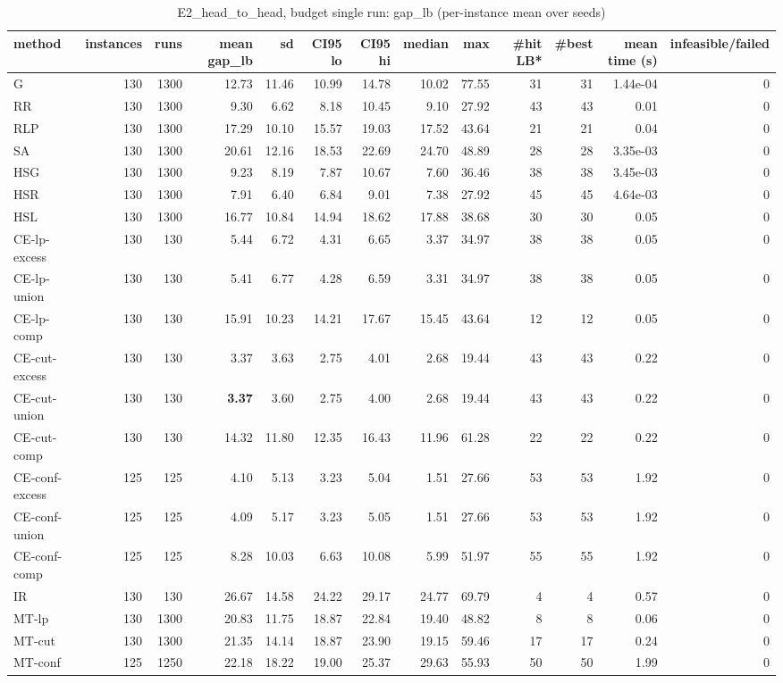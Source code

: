 \begin{table}[htbp]
\centering
\small
\caption{E2\_head\_to\_head, budget single run: gap\_lb (per-instance mean over seeds)}
\label{tab:E2_head_to_head_summary}
\begin{tabular}{lrrrrrrrrrrrr}
\toprule
method & instances & runs & mean gap\_lb & sd & CI95 lo & CI95 hi & median & max & \#hit LB* & \#best & mean time (s) & infeasible/failed \\
\midrule
G & 130 & 1300 & 12.73 & 11.46 & 10.99 & 14.78 & 10.02 & 77.55 & 31 & 31 & 1.44e-04 & 0 \\
RR & 130 & 1300 & 9.30 & 6.62 & 8.18 & 10.45 & 9.10 & 27.92 & 43 & 43 & 0.01 & 0 \\
RLP & 130 & 1300 & 17.29 & 10.10 & 15.57 & 19.03 & 17.52 & 43.64 & 21 & 21 & 0.04 & 0 \\
SA & 130 & 1300 & 20.61 & 12.16 & 18.53 & 22.69 & 24.70 & 48.89 & 28 & 28 & 3.35e-03 & 0 \\
HSG & 130 & 1300 & 9.23 & 8.19 & 7.87 & 10.67 & 7.60 & 36.46 & 38 & 38 & 3.45e-03 & 0 \\
HSR & 130 & 1300 & 7.91 & 6.40 & 6.84 & 9.01 & 7.38 & 27.92 & 45 & 45 & 4.64e-03 & 0 \\
HSL & 130 & 1300 & 16.77 & 10.84 & 14.94 & 18.62 & 17.88 & 38.68 & 30 & 30 & 0.05 & 0 \\
CE-lp-excess & 130 & 130 & 5.44 & 6.72 & 4.31 & 6.65 & 3.37 & 34.97 & 38 & 38 & 0.05 & 0 \\
CE-lp-union & 130 & 130 & 5.41 & 6.77 & 4.28 & 6.59 & 3.31 & 34.97 & 38 & 38 & 0.05 & 0 \\
CE-lp-comp & 130 & 130 & 15.91 & 10.23 & 14.21 & 17.67 & 15.45 & 43.64 & 12 & 12 & 0.05 & 0 \\
CE-cut-excess & 130 & 130 & 3.37 & 3.63 & 2.75 & 4.01 & 2.68 & 19.44 & 43 & 43 & 0.22 & 0 \\
CE-cut-union & 130 & 130 & \textbf{3.37} & 3.60 & 2.75 & 4.00 & 2.68 & 19.44 & 43 & 43 & 0.22 & 0 \\
CE-cut-comp & 130 & 130 & 14.32 & 11.80 & 12.35 & 16.43 & 11.96 & 61.28 & 22 & 22 & 0.22 & 0 \\
CE-conf-excess & 125 & 125 & 4.10 & 5.13 & 3.23 & 5.04 & 1.51 & 27.66 & 53 & 53 & 1.92 & 0 \\
CE-conf-union & 125 & 125 & 4.09 & 5.17 & 3.23 & 5.05 & 1.51 & 27.66 & 53 & 53 & 1.92 & 0 \\
CE-conf-comp & 125 & 125 & 8.28 & 10.03 & 6.63 & 10.08 & 5.99 & 51.97 & 55 & 55 & 1.92 & 0 \\
IR & 130 & 130 & 26.67 & 14.58 & 24.22 & 29.17 & 24.77 & 69.79 & 4 & 4 & 0.57 & 0 \\
MT-lp & 130 & 1300 & 20.83 & 11.75 & 18.87 & 22.84 & 19.40 & 48.82 & 8 & 8 & 0.06 & 0 \\
MT-cut & 130 & 1300 & 21.35 & 14.14 & 18.87 & 23.90 & 19.15 & 59.46 & 17 & 17 & 0.24 & 0 \\
MT-conf & 125 & 1250 & 22.18 & 18.22 & 19.00 & 25.37 & 29.63 & 55.93 & 50 & 50 & 1.99 & 0 \\
\bottomrule
\end{tabular}
\end{table}
